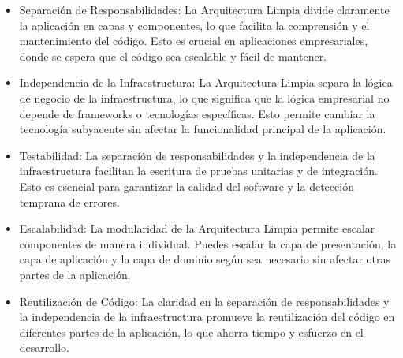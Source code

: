 \documentclass{article} %
\begin{document}
\begin{itemize}
    \item Separación de Responsabilidades: La Arquitectura Limpia divide claramente la aplicación en capas y componentes, lo que facilita la comprensión y el mantenimiento del código. Esto es crucial en aplicaciones empresariales, donde se espera que el código sea escalable y fácil de mantener.
    \item Independencia de la Infraestructura: La Arquitectura Limpia separa la lógica de negocio de la infraestructura, lo que significa que la lógica empresarial no depende de frameworks o tecnologías específicas. Esto permite cambiar la tecnología subyacente sin afectar la funcionalidad principal de la aplicación.
    \item Testabilidad: La separación de responsabilidades y la independencia de la infraestructura facilitan la escritura de pruebas unitarias y de integración. Esto es esencial para garantizar la calidad del software y la detección temprana de errores.
    \item Escalabilidad: La modularidad de la Arquitectura Limpia permite escalar componentes de manera individual. Puedes escalar la capa de presentación, la capa de aplicación y la capa de dominio según sea necesario sin afectar otras partes de la aplicación.
    \item Reutilización de Código: La claridad en la separación de responsabilidades y la independencia de la infraestructura promueve la reutilización del código en diferentes partes de la aplicación, lo que ahorra tiempo y esfuerzo en el desarrollo.
\end{itemize}
\end{document}
